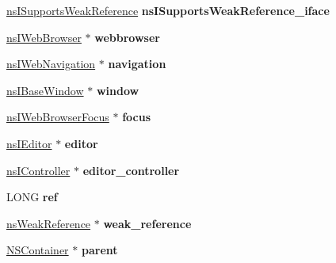 \begin{DoxyCompactItemize}
\hyperlink{interfacens_i_supports_weak_reference}{ns\+I\+Supports\+Weak\+Reference} {\bfseries ns\+I\+Supports\+Weak\+Reference\+\_\+iface}
\item 
\mbox{\label{struct_n_s_container_a367b1131df2d084eb4b9fc62cd94c89a}} 
\hyperlink{interfacens_i_web_browser}{ns\+I\+Web\+Browser} $\ast$ {\bfseries webbrowser}
\item 
\mbox{\label{struct_n_s_container_aecdb6034f7a8e031afec663c3a4e690d}} 
\hyperlink{interfacens_i_web_navigation}{ns\+I\+Web\+Navigation} $\ast$ {\bfseries navigation}
\item 
\mbox{\label{struct_n_s_container_a7f67c1e7bfcd684ade9da19c6caafdb2}} 
\hyperlink{interfacens_i_base_window}{ns\+I\+Base\+Window} $\ast$ {\bfseries window}
\item 
\mbox{\label{struct_n_s_container_ab3ab76e6557e6af97014e25e1cc784cf}} 
\hyperlink{interfacens_i_web_browser_focus}{ns\+I\+Web\+Browser\+Focus} $\ast$ {\bfseries focus}
\item 
\mbox{\label{struct_n_s_container_a703980a5253edaede9da7b2b074ec2fd}} 
\hyperlink{interfacens_i_editor}{ns\+I\+Editor} $\ast$ {\bfseries editor}
\item 
\mbox{\label{struct_n_s_container_a3e67741716a302e8787029840eabc4aa}} 
\hyperlink{interfacens_i_controller}{ns\+I\+Controller} $\ast$ {\bfseries editor\+\_\+controller}
\item 
\mbox{\label{struct_n_s_container_a80ab98aaa784cd8f3af02222464de9b3}} 
L\+O\+NG {\bfseries ref}
\item 
\mbox{\label{struct_n_s_container_a54ed39f270e90e473ab199c2e3579ff1}} 
\hyperlink{structns_weak_reference}{ns\+Weak\+Reference} $\ast$ {\bfseries weak\+\_\+reference}
\item 
\mbox{\label{struct_n_s_container_abc87ff8cd7948ee20240144f0e076387}} 
\hyperlink{struct_n_s_container}{N\+S\+Container} $\ast$ {\bfseries parent}
\item 
\mbox{\label{struct_n_s_container_a6b3407271888b98f0ef4b96e357d37fd}} 

\end{DoxyCompactItemize}
